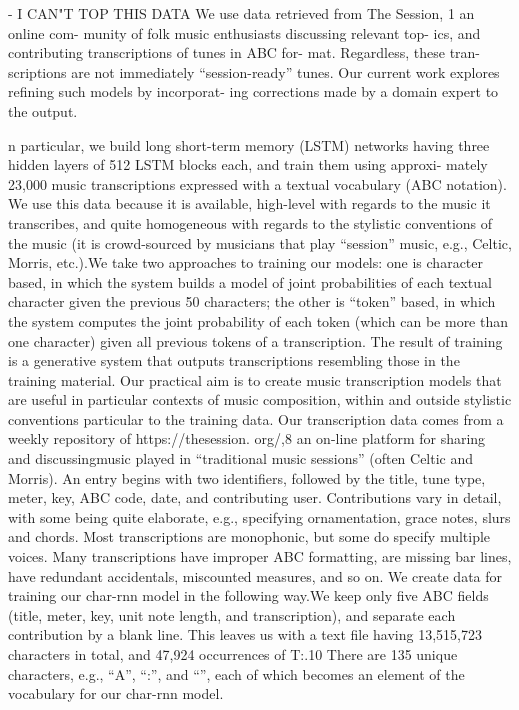 - I CAN"T TOP THIS DATA
We use data retrieved from The Session, 1 an online com- munity of folk music enthusiasts discussing relevant top- ics, and contributing transcriptions of tunes in ABC for- mat.
Regardless, these tran- scriptions are not immediately “session-ready” tunes. Our current work explores refining such models by incorporat- ing corrections made by a domain expert to the output.

\cite{Sturm2016} 
n particular, we build long short-term memory (LSTM) networks having
three hidden layers of 512 LSTM blocks each, and train them using approxi- mately 23,000 music transcriptions expressed with a textual vocabulary (ABC notation). We use this data because it is available, high-level with regards to the music it transcribes, and quite homogeneous with regards to the stylistic conventions of the music (it is crowd-sourced by musicians that play “session” music, e.g., Celtic, Morris, etc.).We take two approaches to training our models: one is character based, in which the system builds a model of joint probabilities of each textual character given the previous 50 characters; the other is “token” based, in which the system computes the joint probability of each token (which can be more than one character) given all previous tokens of a transcription. The result of training is a generative system that outputs transcriptions resembling those in the training material. Our practical aim is to create music transcription models that are useful in particular contexts of music composition, within and outside stylistic conventions particular to the training data. 
Our transcription data comes from a weekly repository of https://thesession. org/,8 an on-line platform for sharing and discussingmusic played in “traditional music sessions” (often Celtic and Morris).
An entry begins with two identifiers, followed by the title, tune type, meter, key, ABC code, date, and contributing user. Contributions vary in detail, with some being quite elaborate, e.g., specifying ornamentation, grace notes, slurs and chords. Most transcriptions are monophonic, but some do specify multiple voices. Many transcriptions have improper ABC formatting, are missing bar lines, have redundant accidentals, miscounted measures, and so on. We create data for training our char-rnn model in the following way.We keep
only five ABC fields (title, meter, key, unit note length, and transcription), and separate each contribution by a blank line. 
This leaves us with a text file having 13,515,723 characters in total, and 47,924 occurrences of T:.10 There are 135 unique characters, e.g., “A”, “:”, and “”, each of which becomes an element of the vocabulary for our char-rnn model.
